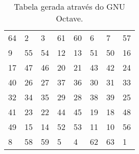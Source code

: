 \begin{table}[!htbp]\centering
\caption{Tabela gerada através do GNU Octave.}
\label{tbl-ex-octave}
\begin{tabular}{llllllll}
\hline
64 & 2 & 3 & 61 & 60 & 6 & 7 & 57\\
9 & 55 & 54 & 12 & 13 & 51 & 50 & 16\\
17 & 47 & 46 & 20 & 21 & 43 & 42 & 24\\
40 & 26 & 27 & 37 & 36 & 30 & 31 & 33\\
32 & 34 & 35 & 29 & 28 & 38 & 39 & 25\\
41 & 23 & 22 & 44 & 45 & 19 & 18 & 48\\
49 & 15 & 14 & 52 & 53 & 11 & 10 & 56\\
8 & 58 & 59 & 5 & 4 & 62 & 63 & 1\\
\hline
\end{tabular}
\end{table}
